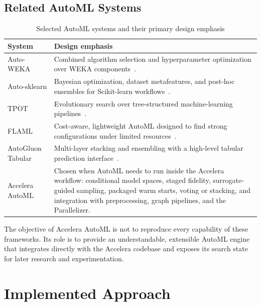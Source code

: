 \documentclass[12pt,a4paper]{report}
\newcommand{\acceleraTableStyle}{%
\small
\renewcommand{\arraystretch}{1.15}
\setlength{\tabcolsep}{4pt}%
}
\begin{document}
\subsection{Related AutoML Systems}

\begin{table}[H]
\centering
\acceleraTableStyle
\caption{Selected AutoML systems and their primary design emphasis}
\label{tab:automl_related_systems}
\begin{tabularx}{\textwidth}{>{\raggedright\arraybackslash}p{}X}
\toprule
\textbf{System} & \textbf{Design emphasis} \\
\midrule

Auto-WEKA &
Combined algorithm selection and hyperparameter optimization over WEKA
components~\cite{autoweka}. \\
\midrule

Auto-sklearn &
Bayesian optimization, dataset metafeatures, and post-hoc ensembles for
Scikit-learn workflows~\cite{autosklearn}. \\
\midrule

TPOT &
Evolutionary search over tree-structured machine-learning
pipelines~\cite{tpot}. \\
\midrule

FLAML &
Cost-aware, lightweight AutoML designed to find strong configurations under
limited resources~\cite{flaml}. \\
\midrule

AutoGluon Tabular &
Multi-layer stacking and ensembling with a high-level tabular prediction
interface~\cite{autogluon}. \\
\midrule

Accelera AutoML &
Chosen when AutoML needs to run inside the Accelera workflow: conditional model
spaces, staged fidelity, surrogate-guided sampling, packaged warm starts,
voting or stacking, and integration with preprocessing, graph pipelines, and
the Parallelizer. \\

\bottomrule
\end{tabularx}
\end{table}

\noindent The objective of Accelera AutoML is not to reproduce every capability
of these frameworks. Its role is to provide an understandable, extensible AutoML
engine that integrates directly with the Accelera codebase and exposes its
search state for later research and experimentation.

\section{Implemented Approach}
\end{document}
